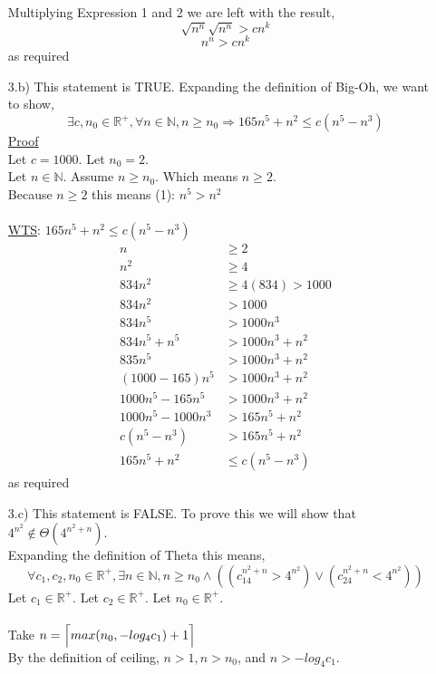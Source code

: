 \documentclass[20pt]{article}
\DeclarePairedDelimiter{\ceil}{\lceil}{\rceil}
\begin{document}
\begin{enumerate}
Multiplying Expression 1 and 2 we are left with the result,
\[ \sqrt{n^n}\sqrt{n^n} > cn^k\]
\[n^n > cn^k\] as required \hfill \Box
\newpage 
\item[3.b)]
This statement is TRUE. Expanding the definition of Big-Oh, we want to show, 
\[\exists c, n_0 \in \mathbb{R}^+, \forall n \in \mathbb{N}, n \geq n_0 \Rightarrow 165n^5 + n^2 \leq c(n^5 -n^3)\]
\underline{Proof}\\
Let $c= 1000.$ Let $n_0 = 2.$\\
Let $n \in \mathbb{N}.$ Assume $n \geq n_0.$ Which means $n \geq 2.$ \\
Because $n \geq 2$ this means (1): $n^5 > n^2$\\\\
\underline{WTS}: $165n^5 + n^2 \leq c(n^5 -n^3)$ 
\begin{align*}
    n &\geq 2 \\
    n^2 &\geq 4 \\
    834n^2 &\geq 4(834) > 1000 \\ 
    834n^2 &> 1000 \\
    834n^5 &> 1000n^3 \tag{since $n \geq 2$}\\
    834n^5 + n^5 &> 1000n^3 + n^2 \tag{because (1): $n^5 > n^2$} \\
    835n^5 &> 1000n^3 + n^2\\
    (1000 - 165)n^5 &> 1000n^3 + n^2\\
    1000n^5 - 165n^5 &> 1000n^3 + n^2\\
    1000n^5 - 1000n^3 &> 165n^5 + n^2\\
    c(n^5 -n^3) &> 165n^5 + n^2\\
    165n^5 + n^2 &\leq c(n^5 - n^3)
\end{align*}
as required \hfill \Box
\newpage 
\item[3.c)]
This statement is FALSE. To prove this we will show that $4^{n^2} \notin \Theta (4^{n^2 +n}). $\\
Expanding the definition of Theta this means,
    \[ \forall c_1, c_2, n_0 \in \mathbb{R}^+ , \exists n \in \mathbb{N}, n \geq n_0 \wedge ((c_14^{n^2 +n} > 4^{n^2}) \vee (c_24^{n^2 +n} < 4^{n^2}) )\]
Let $c_1 \in \mathbb{R}^+.$ Let $c_2 \in \mathbb{R}^+.$ Let $n_0 \in \mathbb{R}^+.$\\\\
Take $ n = \ceil[\Big]{max(n_0, -log_4c_1) + 1}$\\
By the definition of ceiling, $n > 1, n > n_0$, and $n > -log_4c_1.$\\
\\

\end{enumerate}
\end{document}
